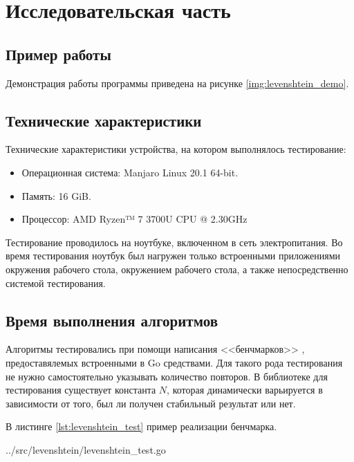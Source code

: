 \chapter{Исследовательская часть}

\section{Пример работы}

Демонстрация работы программы приведена на рисунке \ref{img:levenshtein_demo}.


\section{Технические характеристики}

Технические характеристики устройства, на котором выполнялось тестирование:

\begin{itemize}
	\item Операционная система: Manjaro \cite{manjaro} Linux \cite{linux} 20.1 64-bit.
	\item Память: 16 GiB.
	\item Процессор: AMD Ryzen™ 7 3700U \cite{ryzen} CPU @ 2.30GHz
\end{itemize}

Тестирование проводилось на ноутбуке, включенном в сеть электропитания. Во время тестирования ноутбук был нагружен только встроенными приложениями окружения рабочего стола, окружением рабочего стола, а также непосредственно системой тестирования.

\section{Время выполнения алгоритмов}

Алгоритмы тестировались при помощи написания <<бенчмарков>> \cite{gotest}, предоставялемых встроенными в Go средствами. Для такого рода тестирования не нужно самостоятельно указывать количество повторов. В библиотеке для тестирования существует константа $N$, которая динамически варьируется в зависимости от того, был ли получен стабильный результат или нет.

В листинге \ref{lst:levenshtein_test} пример реализации бенчмарка.

\begin{lstinputlisting}[
	caption={Реализация бенчмарка},
	label={lst:levenshtein_test},
	style={go},
	linerange={1-17},
	]{../src/levenshtein/levenshtein_test.go}
\end{lstinputlisting}

